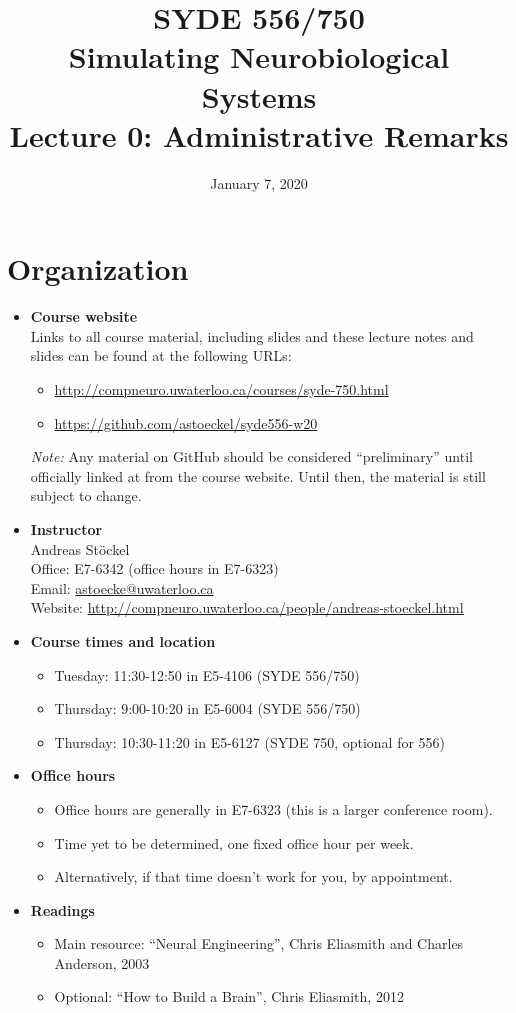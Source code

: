 \documentclass[10pt,letterpaper,oneside]{article}
\date{January 7, 2020}
\title{SYDE 556/750 \\ Simulating Neurobiological Systems \\ Lecture 0: Administrative Remarks}
\begin{document}

\section{Organization}

\begin{itemize}
	\item \textbf{Course website}\\
		  Links to all course material, including slides and these lecture notes and slides can be found at the following URLs:
		  \begin{itemize}
		  	\item \url{http://compneuro.uwaterloo.ca/courses/syde-750.html}
		  	\item \url{https://github.com/astoeckel/syde556-w20}
		  \end{itemize}
		  \emph{Note:} Any material on GitHub should be considered \enquote{preliminary} until officially linked at from the course website. Until then, the material is still subject to change.
	\item \textbf{Instructor}\\
		  Andreas Stöckel\\
		  Office: E7-6342 (office hours in E7-6323)\\
		  Email: \url{astoecke@uwaterloo.ca}\\
		  Website: \url{http://compneuro.uwaterloo.ca/people/andreas-stoeckel.html}
	\item \textbf{Course times and location}
		\begin{itemize}
			\item Tuesday: 11:30-12:50 in E5-4106 (SYDE 556/750)
		  	\item Thursday: 9:00-10:20 in E5-6004 (SYDE 556/750) 
		 	\item Thursday: 10:30-11:20 in E5-6127 (SYDE 750, optional for 556)
		\end{itemize}
	\item \textbf{Office hours}
		\begin{itemize}
			\item Office hours are generally in E7-6323 (this is a larger conference room).
			\item Time yet to be determined, one fixed office hour per week.
			\item Alternatively, if that time doesn't work for you, by appointment.
		\end{itemize}
	\item \textbf{Readings}
		\begin{itemize}
			\item Main resource: \enquote{Neural Engineering}, Chris Eliasmith and Charles Anderson, 2003 \cite{eliasmith2003neural}
			\item Optional: \enquote{How to Build a Brain}, Chris Eliasmith, 2012 \cite{eliasmith2013how}
		\end{itemize}
\end{itemize}
\end{document}
